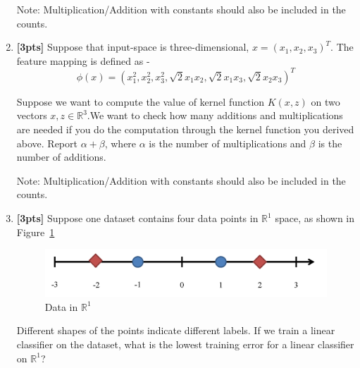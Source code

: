 \documentclass[12pt]{article}
\newcommand{\R}{\mathbb{R}}
\begin{document}
\begin{enumerate}
    Note: Multiplication/Addition with constants should also be included in the counts.
    
    \begin{tcolorbox}[fit,height=1cm, width=2cm, blank, borderline={1pt}{-2pt},nobeforeafter]
    \end{tcolorbox}
    
    \clearpage
    \item \textbf{[3pts]} Suppose that input-space is three-dimensional, \( x = (x_1, x_2, x_3)^T\). The feature mapping is defined as - \[\phi(x) = (x_1^2, x_2^2, x_3^2, \sqrt{2}x_1x_2, \sqrt{2}x_1x_3,\sqrt{2}x_2x_3)^T\]

    Suppose we want to compute the value of kernel function \(K(x,z)\) on two vectors \(x,z \in {\mathbb{R}}^3\).We want to check how many additions and multiplications are needed if you do the computation through the kernel function you derived above. Report \(\alpha + \beta\), where \(\alpha\) is the number of multiplications and \(\beta\) is the number of additions.

    Note: Multiplication/Addition with constants should also be included in the counts.
    
    \begin{tcolorbox}[fit,height=1cm, width=2cm, blank, borderline={1pt}{-2pt},nobeforeafter]
    \end{tcolorbox}
    
    
    \item \textbf{[3pts]} Suppose one dataset contains four data points in \(\R^1\) space, as shown in Figure~\ref{fig:lindata}

    \begin{figure}[H]
    \centering
        \includegraphics[width=0.7\linewidth]{figures/lineardataset.png}
        \caption{Data in $\R^1$}
        \label{fig:lindata}
    \end{figure}


    Different shapes of the points indicate different labels. If we train a linear classifier on the dataset, what is the lowest training error for a linear classifier on \(\R^1\)?
    
    \begin{tcolorbox}[fit,height=1cm, width=2cm, blank, borderline={1pt}{-2pt},nobeforeafter]
    \end{tcolorbox}
    

\end{enumerate}
\end{document}
